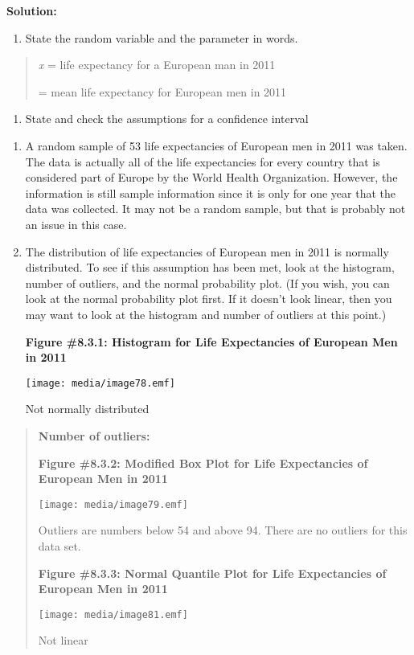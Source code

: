 \documentclass[]{book}
\providecommand{\tightlist}{%
  \setlength{\itemsep}{0pt}\setlength{\parskip}{0pt}}
\begin{document}
\textbf{Solution:}

\begin{enumerate}
\def\labelenumi{\arabic{enumi}.}
\tightlist
\item
  State the random variable and the parameter in words.
\end{enumerate}

\begin{quote}
\emph{x} = life expectancy for a European man in 2011

= mean life expectancy for European men in 2011
\end{quote}

\begin{enumerate}
\def\labelenumi{\arabic{enumi}.}
\setcounter{enumi}{1}
\tightlist
\item
  State and check the assumptions for a confidence interval
\end{enumerate}

\begin{enumerate}
\def\labelenumi{\alph{enumi}.}
\item
  A random sample of 53 life expectancies of European men in 2011 was
  taken. The data is actually all of the life expectancies for every
  country that is considered part of Europe by the World Health
  Organization. However, the information is still sample information
  since it is only for one year that the data was collected. It may
  not be a random sample, but that is probably not an issue in this
  case.
\item
  The distribution of life expectancies of European men in 2011 is
  normally distributed. To see if this assumption has been met, look
  at the histogram, number of outliers, and the normal probability
  plot. (If you wish, you can look at the normal probability plot
  first. If it doesn't look linear, then you may want to look at the
  histogram and number of outliers at this point.)

  \textbf{Figure \#8.3.1: Histogram for Life Expectancies of European Men in
  2011}

  \texttt{[image: media/image78.emf]}

  Not normally distributed
\end{enumerate}

\begin{quote}
\textbf{Number of outliers:}

\textbf{Figure \#8.3.2: Modified Box Plot for Life Expectancies of European
Men in 2011}

\texttt{[image: media/image79.emf]}

Outliers are numbers below 54 and above 94. There are no outliers for
this data set.

\textbf{Figure \#8.3.3: Normal Quantile Plot for Life Expectancies of
European Men in 2011}

\texttt{[image: media/image81.emf]}

Not linear
\end{quote}
\end{document}
